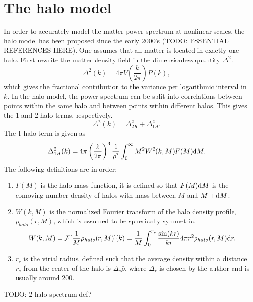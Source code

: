 \documentclass[11pt]{book}
\DeclareRobustCommand{\d}{\ifmmode\text{d}\else d\fi}
\newcommand{\br}[1]{\ensuremath{\left( #1 \right)}}
\begin{document}
\section{The halo model}
In order to accurately model the matter power spectrum at nonlinear scales, the halo model has been proposed since the early 2000's (TODO: ESSENTIAL REFERENCES HERE). One assumes that all matter is located in exactly one halo. First rewrite the matter density field in the dimensionless quantity $\Delta^2$:
\begin{equation}
    \Delta^2(k) = 4\pi V\br{\frac{k}{2
    \pi}}P(k),
\end{equation}
which gives the fractional contribution to the variance per logarithmic interval in $k$.
In the halo model, the power spectrum can be split into correlations between points within the same halo and between points within different halos. This gives the 1 and 2 halo terms, respectively.
\begin{equation}
    \Delta^2(k)=\Delta^2_{2H}+\Delta^2_{1H}.
\end{equation}
The 1 halo term is given as
\begin{equation}
    \Delta^2_{1H}(k) = 4\pi\br{\frac{k}{2\pi}}^3\frac{1}{\bar\rho^2}\int_{0}^\infty M^2 W^2(k, M)F(M)\d M.
\end{equation}
The following definitions are in order:
\begin{enumerate}
    \item $F(M)$ is the halo mass function, it is defined so that $F(M)\d M$ is the comoving number density of halos with mass between $M$ and $M + \d M$.
    \item $W(k, M)$ is the normalized Fourier transform of the halo density profile, $\rho_{halo}(r, M)$, which is assumed to be spherically symmetric:
    \begin{equation}
        W(k,M) = \mathcal F[\frac{1}{M}\rho_{halo}(r,M)](k) = \frac{1}{M}\int_0^{r_v}\frac{\sin(kr)}{kr}4\pi r^2\rho_{halo}(r, M) \d r.
    \end{equation}
    \item $r_v$ is the virial radius, defined such that the average density within a distance $r_v$ from the center of the halo is $\Delta_v \bar\rho$, where $\Delta_v$ is chosen by the author and is usually around 200.
\end{enumerate}
TODO: 2 halo spectrum def?
\end{document}
